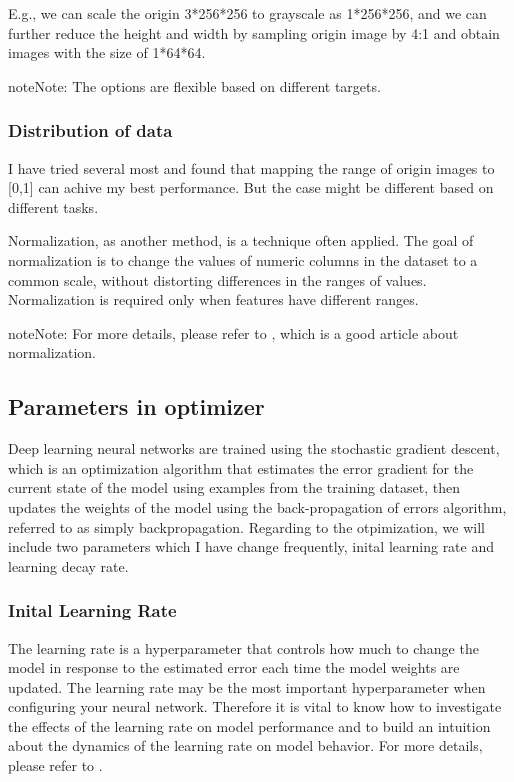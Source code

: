 \documentclass[letterpaper,10pt,english]{sphinxmanual}
\begin{document}
E.g., we can scale the origin 3*256*256 to grayscale as 1*256*256, and we can further reduce the height and width by sampling origin image by 4:1 and obtain images with the size of 1*64*64.

\begin{sphinxadmonition}{note}{Note:}
The options are flexible based on different targets.
\end{sphinxadmonition}


\subsubsection{Distribution of data}
\label{\detokenize{usage/adjust:distribution-of-data}}
I have tried several most and found that mapping the range of origin images to {[}0,1{]} can achive my best performance. But the case might be different based on different tasks.

Normalization, as another method, is a technique often applied. The goal of normalization is to change the values of numeric columns in the dataset to a common scale, without distorting differences in the ranges of values. Normalization is required only when features have different ranges.

\begin{sphinxadmonition}{note}{Note:}
For more details, please refer to , which is a good article about normalization.
\end{sphinxadmonition}


\subsection{Parameters in optimizer}
\label{\detokenize{usage/adjust:parameters-in-optimizer}}
Deep learning neural networks are trained using the stochastic gradient descent, which is an optimization algorithm that estimates the error gradient for the current state of the model using examples from the training dataset, then updates the weights of the model using the back-propagation of errors algorithm, referred to as simply backpropagation. Regarding to the otpimization, we will include two parameters which I have change frequently, inital learning rate and learning decay rate.


\subsubsection{Inital Learning Rate}
\label{\detokenize{usage/adjust:inital-learning-rate}}
The learning rate is a hyperparameter that controls how much to change the model in response to the estimated error each time the model weights are updated. The learning rate may be the most important hyperparameter when configuring your neural network. Therefore it is vital to know how to investigate the effects of the learning rate on model performance and to build an intuition about the dynamics of the learning rate on model behavior. For more details, please refer to .
\end{document}
